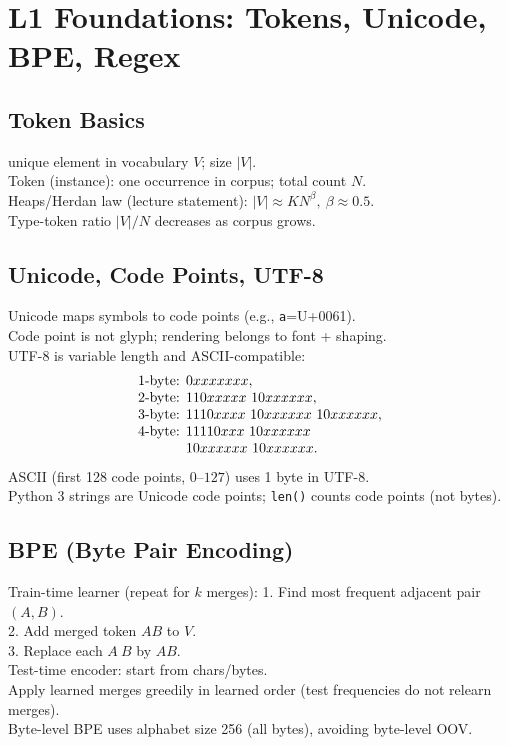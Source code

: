 \section{L1 Foundations: Tokens, Unicode, BPE, Regex}
\subsection*{Token Basics}
unique element in vocabulary $V$; size $|V|$.\\
Token (instance): one occurrence in corpus; total count $N$.\\
Heaps/Herdan law (lecture statement): $|V|\approx KN^{\beta},\ \beta\approx 0.5$.\\
Type-token ratio $|V|/N$ decreases as corpus grows.

\subsection*{Unicode, Code Points, UTF-8}
Unicode maps symbols to code points (e.g., \texttt{a}=U+0061).\\
Code point is not glyph; rendering belongs to font + shaping.\\
UTF-8 is variable length and ASCII-compatible:
\[
\begin{array}{l}
\text{1-byte: }0xxxxxxx,\\
\text{2-byte: }110xxxxx\ 10xxxxxx,\\
\text{3-byte: }1110xxxx\ 10xxxxxx\ 10xxxxxx,\\
\text{4-byte: }11110xxx\ 10xxxxxx\\
\text{\phantom{4-byte: }}10xxxxxx\ 10xxxxxx.
\end{array}
\]
ASCII (first 128 code points, $0$--$127$) uses 1 byte in UTF-8.\\
Python 3 strings are Unicode code points; \texttt{len()} counts code points (not bytes).

\subsection*{BPE (Byte Pair Encoding)}
Train-time learner (repeat for $k$ merges):
1. Find most frequent adjacent pair $(A,B)$.\\
2. Add merged token $AB$ to $V$.\\
3. Replace each $A\ B$ by $AB$.\\
Test-time encoder: start from chars/bytes.\\
Apply learned merges greedily in learned order (test frequencies do not relearn merges).\\
Byte-level BPE uses alphabet size 256 (all bytes), avoiding byte-level OOV.

